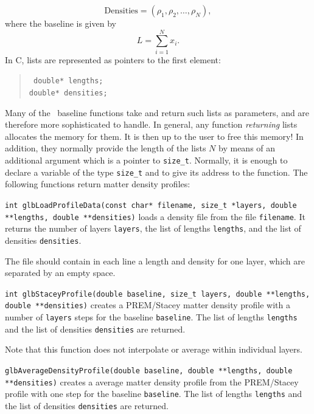 \begin{equation}
\mathrm{Densities} = (\rho_1,\rho_2, \hdots, \rho_N), 
\end{equation}
where the baseline is given by
\begin{equation}
L = \sum\limits_{i=1}^N x_i.
\end{equation}
In C, lists are represented as pointers to the first element:
\begin{quote}
{\tt  
  double* lengths; \\
  double* densities;
}
\end{quote}
Many of the \GLOBES\ baseline functions take and return
such lists as parameters, and are therefore more sophisticated
to handle. In general, any function
{\em returning} lists allocates the memory for them.
It is then up to the user to free this memory!
In addition, they normally provide the length of the lists $N$
by means of an additional argument which is a pointer to {\tt size\_t}. 
Normally, it is enough to declare
a variable of the type {\tt size\_t} and to give its address to the function.
The following functions return matter density profiles:
\begin{function}
{\tt int glbLoadProfileData(const char* filename, size\_t *layers, double **lengths, double **densities)} loads a density file from the file
{\tt filename}. It returns the number of layers {\tt layers}, the
list of lengths {\tt lengths}, and the list of densities {\tt densities}.
\end{function}
The file should contain in each line a length and density for one layer,
which are separated by an empty space.
\begin{function}
{\tt int glbStaceyProfile(double baseline, size\_t layers, double **lengths, double **densities)} creates a PREM/Stacey matter density profile with a
number of {\tt layers} steps for the baseline {\tt baseline}. The list of lengths {\tt lengths} and the list of densities {\tt densities} are returned.
\end{function}
Note that this function does not interpolate or average within individual layers.
\begin{function}
{\tt glbAverageDensityProfile(double baseline, double **lengths, 
double **densities)} creates a average matter density profile from the PREM/Stacey profile with one step for the baseline {\tt baseline}. The list of lengths {\tt lengths} and the list of densities {\tt densities} are returned.
\end{function}
